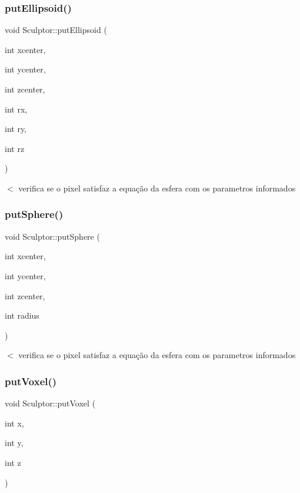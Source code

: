 \mbox{\label{classSculptor_a093615b0c2b9b3a17a56300b9b939f39}} 
\subsubsection{\texorpdfstring{put\+Ellipsoid()}{putEllipsoid()}}
{\footnotesize\ttfamily void Sculptor\+::put\+Ellipsoid (\begin{DoxyParamCaption}\item[{int}]{xcenter,  }\item[{int}]{ycenter,  }\item[{int}]{zcenter,  }\item[{int}]{rx,  }\item[{int}]{ry,  }\item[{int}]{rz }\end{DoxyParamCaption})}

$<$ verifica se o pixel satisfaz a equação da esfera com os parametros informados \mbox{\label{classSculptor_a794a2b6ee8fc8098fd6150cb46101fc6}} 
\subsubsection{\texorpdfstring{put\+Sphere()}{putSphere()}}
{\footnotesize\ttfamily void Sculptor\+::put\+Sphere (\begin{DoxyParamCaption}\item[{int}]{xcenter,  }\item[{int}]{ycenter,  }\item[{int}]{zcenter,  }\item[{int}]{radius }\end{DoxyParamCaption})}

$<$ verifica se o pixel satisfaz a equação da esfera com os parametros informados \mbox{\label{classSculptor_a4bdea3048b419d58e93074060eaa7b52}} 
\subsubsection{\texorpdfstring{put\+Voxel()}{putVoxel()}}
{\footnotesize\ttfamily void Sculptor\+::put\+Voxel (\begin{DoxyParamCaption}\item[{int}]{x,  }\item[{int}]{y,  }\item[{int}]{z }\end{DoxyParamCaption})}

